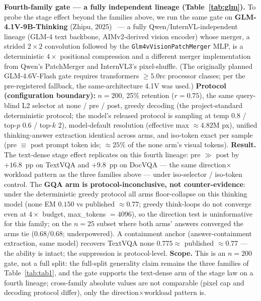\documentclass[sigconf,review,anonymous]{acmart}
\begin{document}
\textbf{Fourth-family gate --- a fully independent lineage
(Table~\ref{tab:glm}).} To probe the stage effect beyond the families above,
we run the same gate on \textbf{GLM-4.1V-9B-Thinking} (Zhipu,
2025)~\cite{hong2025glm41v} --- a fully Qwen/InternVL-independent lineage (GLM-4
text backbone, AIMv2-derived vision encoder) whose merger, a strided
$2\!\times\!2$ convolution followed by the \texttt{Glm4vVisionPatchMerger}
MLP, is a deterministic $4\times$ positional compression and a different
merger implementation from Qwen's PatchMerger and InternVL3's pixel-shuffle.
(The originally planned GLM-4.6V-Flash gate requires transformers $\geq
5.0$rc processor classes; per the pre-registered fallback, the
same-architecture 4.1V was used.) \textbf{Protocol (configuration
boundary):} $n = 200$, 25\% retention ($r = 0.75$), the same query-blind L2
selector at none / pre / post, greedy decoding (the project-standard
deterministic protocol; the model's released protocol is sampling at temp
$0.8$ / top-$p$ $0.6$ / top-$k$ $2$), model-default resolution (effective
max $\approx 4.82$M px), unified thinking-answer extraction identical across
arms, and iso-token exact per sample (pre $\equiv$ post prompt token ids;
$\approx 25\%$ of the none arm's visual tokens). \textbf{Result.} The
text-dense stage effect replicates on this fourth lineage: pre $\gg$ post by
$+16.8$~pp on TextVQA and $+9.8$~pp on DocVQA --- the same
direction$\times$workload pattern as the three families above --- under
iso-selector / iso-token control. The \textbf{GQA arm is
protocol-inconclusive, not counter-evidence}: under the deterministic greedy
protocol all arms floor-collapse on this thinking model (none EM $0.150$ vs
published $\approx 0.77$; greedy think-loops do not converge even at
$4\times$ budget, max\_tokens $= 4096$), so the direction test is
uninformative for this family; on the $n = 25$ subset where both arms'
answers converged the arms tie ($0.68 / 0.68$; underpowered). A containment
anchor (answer-containment extraction, same model) recovers TextVQA none
$0.775 \approx$ published $\approx 0.77$ --- the ability is intact; the
suppression is protocol-level. \textbf{Scope.} This is an $n = 200$ gate,
not a full split: the full-split generality claim remains the three families
of Table~\ref{tab:tab1}, and the gate supports the
text-dense arm of the stage law on a fourth lineage;
cross-family absolute values are not comparable (pixel cap and decoding
protocol differ), only the direction$\times$workload pattern is.
\end{document}
